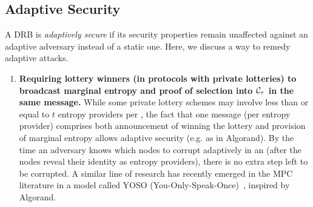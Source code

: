 \subsection{Adaptive Security}
\label{subsection:adaptive}
A DRB is \textit{adaptively secure} if its security properties remain unaffected against an adaptive adversary instead of a static one.
Here, we discuss a way to remedy adaptive attacks.

\begin{enumerate}
\item \textbf{Requiring lottery winners (in protocols with private lotteries) to broadcast marginal entropy and proof of selection into $\mathcal{C}_\tau$ in the same message.} While some private lottery schemes may involve less than or equal to $t$ entropy providers per \epoch, the fact that one message (per entropy provider) comprises both announcement of winning the lottery and provision of marginal entropy allows adaptive security (e.g. as in Algorand). By the time an adversary knows which nodes to corrupt adaptively in an \epoch (after the nodes reveal their identity as entropy providers), there is no extra step left to be corrupted. A similar line of research has recently emerged in the MPC literature in a model called YOSO (You-Only-Speak-Once)~\cite{gentry2021yoso}, inspired by Algorand.
\end{enumerate}

